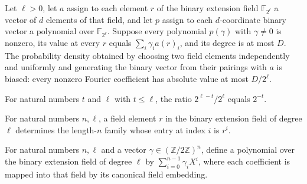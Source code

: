 \begin{theorem}
\label{FABL.fieldPairingDensity_isBiased_of_polynomial}
\leanok
{}
Let $\ell>0$, let $a$ assign to each element $r$ of the binary extension field $\mathbb
F_{2^\ell}$ a vector of $d$ elements of that field, and let $p$ assign to each
$d$-coordinate binary vector a polynomial over $\mathbb F_{2^\ell}$. Suppose every
polynomial $p(\gamma)$ with $\gamma\ne0$ is nonzero, its value at every $r$ equals
$\sum_i\gamma_i a(r)_i$, and its degree is at most $D$. The probability density obtained
by choosing two field elements independently and uniformly and generating the binary
vector from their pairings with $a$ is biased: every nonzero Fourier coefficient has
absolute value at most $D/2^\ell$.
\end{theorem}

\begin{theorem}
\label{FABL.dyadicFieldRatio_eq_invPow}
\leanok
{}
For natural numbers $t$ and $\ell$ with $t\leq\ell$, the ratio $2^{\ell-t}/2^\ell$
equals $2^{-t}$.
\end{theorem}

\begin{definition}
\label{FABL.shiftedSmallBiasFieldFamily}
\leanok
{}
For natural numbers $n,\ell$, a field element $r$ in the binary extension field of
degree $\ell$ determines the length-$n$ family whose entry at index $i$ is $r^i$.
\end{definition}

\begin{definition}
\label{FABL.shiftedSmallBiasPolynomial}
\leanok
{}
For natural numbers $n,\ell$ and a vector $\gamma\in(\mathbb{Z}/2\mathbb{Z})^n$, define
a polynomial over the binary extension field of degree $\ell$ by
$\sum_{i=0}^{n-1}\gamma_iX^i$, where each coefficient is mapped into that field by its
canonical field embedding.
\end{definition}

